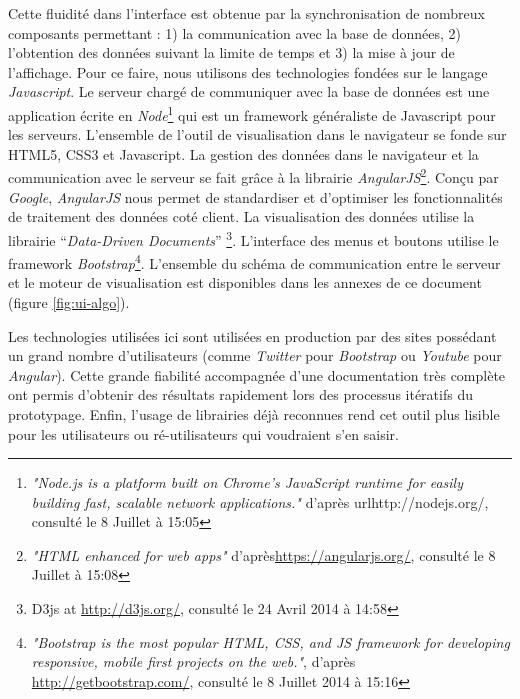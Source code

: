     Cette fluidité dans l'interface est obtenue par la  synchronisation de nombreux composants permettant : 1) la communication avec la base de données, 2) l'obtention des données suivant la limite de temps et 3) la mise à jour de l'affichage. Pour ce faire, nous utilisons des technologies fondées sur le langage \textit{Javascript}. Le serveur chargé de communiquer avec la base de données est une application écrite en \textit{Node}\footnote{ \textit{"Node.js is a platform built on Chrome's JavaScript runtime for easily building fast, scalable network applications."} d'après url{http://nodejs.org/}, consulté le 8 Juillet à 15:05} qui est un framework généraliste de Javascript pour les serveurs. L{\textquoteright}ensemble de l{\textquoteright}outil de visualisation dans le navigateur se fonde sur HTML5, CSS3 et Javascript. La gestion des données dans le navigateur et la communication avec le serveur se fait grâce à la librairie \textit{AngularJS}\footnote{\textit{"HTML enhanced for web apps"} d'après\url{https://angularjs.org/}, consulté le 8 Juillet à 15:08}. Conçu par \textit{Google}, \textit{AngularJS} nous permet de standardiser et d'optimiser les fonctionnalités de traitement des données coté client. La visualisation des données utilise la librairie {\textquotedblleft}\textit{Data-Driven Documents}{\textquotedblright} \citep{Bostock2011}\footnote{ D3js at \url{http://d3js.org/,} consulté le 24 Avril 2014 à 14:58}. L'interface des menus et boutons utilise le framework \textit{Bootstrap}\footnote{\textit{"Bootstrap is the most popular HTML, CSS, and JS framework for developing responsive, mobile first projects on the web."}, d'après \url{http://getbootstrap.com/}, consulté le 8 Juillet 2014 à 15:16}. L'ensemble du schéma de communication entre le serveur et le moteur de visualisation est disponibles dans les annexes de ce document (figure \ref{fig:ui-algo}).

    Les technologies utilisées ici sont utilisées en production par des sites possédant un grand nombre d'utilisateurs (comme \textit{Twitter} pour \textit{Bootstrap} ou \textit{Youtube} pour \textit{Angular}). Cette grande fiabilité accompagnée d'une documentation très complète ont permis d'obtenir des résultats rapidement lors des processus itératifs du prototypage. Enfin, l'usage de librairies déjà reconnues rend cet outil plus lisible pour les utilisateurs ou ré-utilisateurs qui voudraient s'en saisir.